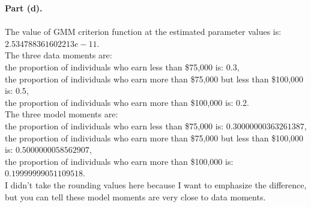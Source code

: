 \documentclass[letterpaper,12pt]{article}
\theoremstyle{definition}
\begin{document}
\noindent\textbf{Part (d).}\\
\\
The value of GMM criterion function at the estimated parameter values is: \\
$2.534788361602213e-11$.\\
The three data moments are: \\
the proportion of individuals who earn less than \$75,000 is: $0.3$, \\
the proportion of individuals who earn more than \$75,000 but less than \$100,000 is: $0.5$, \\
the proportion of individuals who earn more than \$100,000 is: $0.2$. \\
The three model moments are: \\
the proportion of individuals who earn less than \$75,000 is: $0.30000000363261387$, \\
the proportion of individuals who earn more than \$75,000 but less than \$100,000 is: $0.5000000058562907$, \\
the proportion of individuals who earn more than \$100,000 is: $0.19999999051109518$.\\
I didn't take the rounding values here because I want to emphasize the difference, but you can tell these model moments are very close to data moments.\\
\begin{figure}[htb]\centering\captionsetup{width=4.0in}
  \label{Fig1d}
\end{figure}
\end{document}
